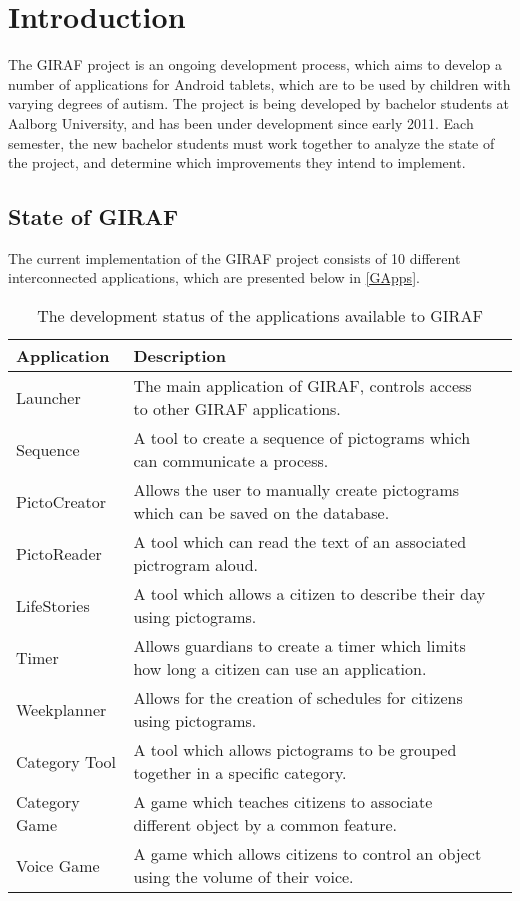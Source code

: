 \chapter{Introduction}
The GIRAF project is an ongoing development process, which aims to develop a
number of applications for Android tablets, which are to be used by children
with varying degrees of autism. The project is being developed by bachelor
students at Aalborg University, and has been under development since early 2011.
Each semester, the new bachelor students must work together to analyze the state
of the project, and determine which improvements they intend to implement.

\section{State of GIRAF}

The current implementation of the GIRAF project consists of 10 different
interconnected applications, which are presented below in \autoref{GApps}.

\begin{table}[H]
\centering
\begin{tabular}{|p{2.8cm}|p{2.2cm}|p{7cm}|}
\hline
Application			& Description \\\hline
Launcher  			& The main application of GIRAF, controls access
to other GIRAF applications. \\\hline 
Sequence	       	& A tool to create a sequence of pictograms which can
communicate a process.\\\hline 
PictoCreator  	   	& Allows the user to manually create pictograms
which can be saved on the database.\\\hline
PictoReader	   		& A tool which can read the text of an associated
pictrogram aloud.\\\hline
LifeStories	   		& A tool which allows a citizen to describe their day
using pictograms.\\\hline 
Timer     	   		& Allows guardians to create a timer which
limits how long a citizen can use an application.\\\hline 
Weekplanner 		& Allows for the creation of schedules for citizens
using pictograms. \\\hline 
Category Tool		& A tool which allows pictograms to be grouped together
in a specific category. \\\hline 
Category Game   	& A game which teaches citizens to associate
different object by a common feature. \\\hline 
Voice Game  		& A game which allows citizens to control an object
using the volume of their voice. \\\hline
\end{tabular} 
\caption{The development status of the applications available to GIRAF}
\label{GApps}
\end{table}

